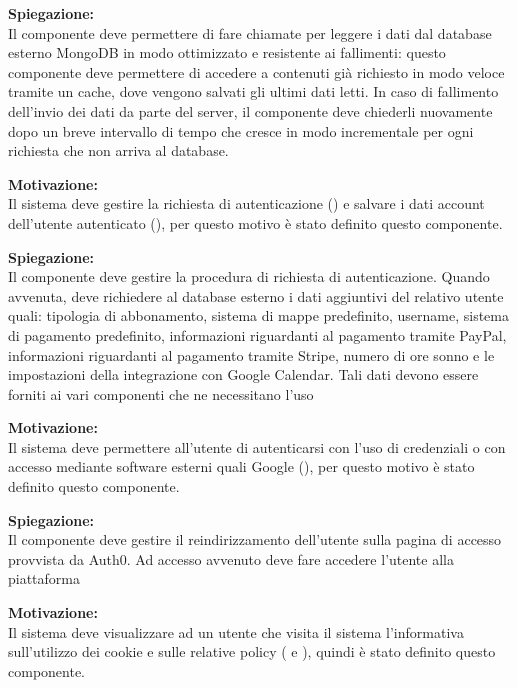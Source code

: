 \begin{listaPersonale}[ACI]{}
    \textbf{Spiegazione:}\\
    Il componente deve permettere di fare chiamate per leggere i dati dal database esterno MongoDB in modo ottimizzato e resistente ai fallimenti: questo componente deve permettere di accedere a contenuti già richiesto in modo veloce tramite un cache, dove vengono salvati gli ultimi dati letti. In caso di fallimento dell'invio dei dati da parte del server, il componente deve chiederli nuovamente dopo un breve intervallo di tempo che cresce in modo incrementale per ogni richiesta che non arriva al database.



    \textbf{Motivazione:}\\
    Il sistema deve gestire la richiesta di autenticazione () e salvare i dati account dell'utente autenticato (), per questo motivo è stato definito questo componente.

    \textbf{Spiegazione:}\\
    Il componente deve gestire la procedura di richiesta di autenticazione. Quando avvenuta, deve richiedere al database esterno i dati aggiuntivi del relativo utente quali: tipologia di abbonamento, sistema di mappe predefinito, username, sistema di pagamento predefinito, informazioni riguardanti al pagamento tramite PayPal, informazioni riguardanti al pagamento tramite Stripe, numero di ore sonno e le impostazioni della integrazione con Google Calendar. Tali dati devono essere forniti ai vari componenti che ne necessitano l'uso



    \textbf{Motivazione:}\\
    Il sistema deve permettere all'utente di autenticarsi con l'uso di credenziali o con accesso mediante software esterni quali Google (), per questo motivo è stato definito questo componente.

    \textbf{Spiegazione:}\\
    Il componente deve gestire il reindirizzamento dell'utente sulla pagina di accesso provvista da Auth0. Ad accesso avvenuto deve fare accedere l'utente alla piattaforma



    \textbf{Motivazione:}\\
    Il sistema deve visualizzare ad un utente che visita il sistema l'informativa sull'utilizzo dei cookie e sulle relative policy ( e ), quindi è stato definito questo componente.


\end{listaPersonale}
